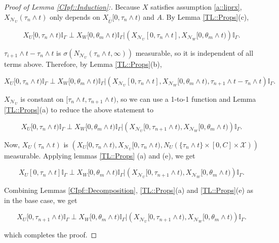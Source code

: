 \documentclass[12pt]{article}
\newcommand{\mb}{\mathbb}
\newcommand{\mc}{\mathcal}
\newcommand{\ov}{\overline}
\newcommand{\sta}{\mc{X}}							%
\newcommand{\neigh}[1]{\mc{N}_{#1}}					%
\newcommand{\cl}[1]{\ov{#1}}						%
\newcommand{\Xf}{X}									%
\newcommand{\poiss}{N}								%
\newcommand{\poissv}[1]{_{#1}}						%
\newcommand{\vind}[1]{_{#1}}						%
\newcommand{\tme}[1]{(#1)}							%
\newcommand{\tmi}[1]{#1}							%
\newcommand{\rt}{\tau}								%
\renewcommand{\it}[1]{_{#1}}						%
\newcommand{\seto}{U}								%
\newcommand{\sett}{W}								%
\newcommand{\rtt}{\theta}							%
\newcommand{\apath}{\Gamma}						%
\newcommand{\rv}{A}								%
\newcommand{\indo}{n}							%
\newcommand{\indt}{m}							%
\newcommand{\const}{C}							%
\begin{document}
\begin{proof}[Proof of Lemma \ref{CIpf::Induction}:]
Because \(\Xf\) satisfies assumption \ref{a::liprx}, \(\Xf\vind{\neigh{\seto}}\tme{\rt\it{\indo}\wedge t}\) only depends on \(\Xf\vind{\cl{\cl{\seto}}}\tmi{[0,\rt\it{\indo}\wedge t)}\) and \(\rv\). By Lemma \ref{TL::Props}(c), 

\[\Xf\vind{\seto}\tmi{[0,\rt\it{\indo}\wedge t)}\mb{I}_{\apath}\perp \Xf\vind{\sett}\tmi{[0,\rtt\it{\indt}\wedge t)}\mb{I}_{\apath}|\left(\Xf\vind{\neigh{\seto}}\tmi{[0,\rt\it{\indo}\wedge t]},\Xf\vind{\neigh{\sett}}\tmi{[0,\rtt\it{\indt}\wedge t)}\right)\mb{I}_{\apath}.\]

\(\rt\it{i+1}\wedge t - \rt\it{\indo}\wedge t\) is \(\sigma(\poiss\poissv{\neigh{\seto}}(\rt\it{\indo}\wedge t,\infty))\) measurable, so it is independent of all terms above. Therefore, by Lemma \ref{TL::Props}(b),

\[\Xf\vind{\seto}\tmi{[0,\rt\it{\indo}\wedge t)}\mb{I}_{\apath}\perp \Xf\vind{\sett}\tmi{[0,\rtt\it{\indt}\wedge t)}\mb{I}_{\apath}|\left(\Xf\vind{\neigh{\seto}}\tmi{[0,\rt\it{\indo}\wedge t]},\Xf\vind{\neigh{\sett}}\tmi{[0,\rtt\it{\indt}\wedge t)},\rt\it{\indo+1}\wedge t - \rt\it{\indo}\wedge t\right)\mb{I}_{\apath}.\]

\(\Xf\vind{\neigh{\seto}}\) is constant on \([\rt\it{\indo}\wedge t,\rt\it{\indo+1}\wedge t)\), so we can use a 1-to-1 function and Lemma \ref{TL::Props}(a) to reduce the above statement to

\[\Xf\vind{\seto}\tmi{[0,\rt\it{\indo}\wedge t)}\mb{I}_{\apath}\perp \Xf\vind{\sett}\tmi{[0,\rtt\it{\indt}\wedge t)}\mb{I}_{\apath}|\left(\Xf\vind{\neigh{\seto}}\tmi{[0,\rt\it{\indo+1}\wedge t)},\Xf\vind{\neigh{\sett}}\tmi{[0,\rtt\it{\indt}\wedge t)}\right)\mb{I}_{\apath}.\]

Now, \(\Xf\vind{\seto}\tme{\rt\it{\indo}\wedge t}\) is \(\left(\Xf\vind{\seto}\tmi{[0,\rt\it{\indo}\wedge t)}, \Xf\vind{\neigh{\seto}}\tmi{[0,\rt\it{\indo}\wedge t)}, \poiss\poissv{\seto}(\{\rt\it{\indo}\wedge t\}\times [0,\const]\times\sta)\right)\) measurable. Applying lemmas \ref{TL::Props} (a) and (e), we get

\[\Xf\vind{\seto}\tmi{[0,\rt\it{\indo}\wedge t]}\mb{I}_{\apath}\perp \Xf\vind{\sett}\tmi{[0,\rtt\it{\indt}\wedge t)}\mb{I}_{\apath}|\left(\Xf\vind{\neigh{\seto}}\tmi{[0,\rt\it{\indo+1}\wedge t)},\Xf\vind{\neigh{\sett}}\tmi{[0,\rtt\it{\indt}\wedge t)}\right)\mb{I}_{\apath}.\]

Combining Lemmas \ref{CIpf::Decomposition}, \ref{TL::Props}(a) and \ref{TL::Props}(e) as in the base case, we get

\[\Xf\vind{\seto}\tmi{[0,\rt\it{\indo+1}\wedge t)}\mb{I}_{\apath}\perp \Xf\vind{\sett}\tmi{[0,\rtt\it{\indt}\wedge t)}\mb{I}_{\apath}|\left(\Xf\vind{\neigh{\seto}}\tmi{[0,\rt\it{\indo+1}\wedge t)},\Xf\vind{\neigh{\sett}}\tmi{[0,\rtt\it{\indt}\wedge t)}\right)\mb{I}_{\apath}.\]

which completes the proof.
\end{proof}
\end{document}
